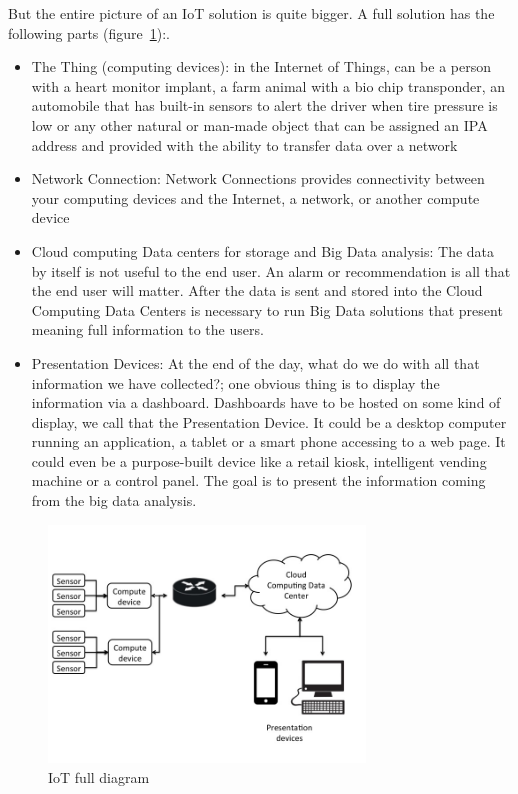 But the entire picture of an IoT solution is quite bigger. A full solution has 
the following parts (figure~\ref{fig:1.1}):.

\begin{itemize} 

\item The Thing (computing devices):  in the Internet of
Things, can be a person with a heart monitor implant, a farm animal with a bio
chip transponder, an automobile that has built-in sensors to alert the driver
when tire pressure is low or any other natural or man-made object that can be
assigned an IPA address and provided with the ability to transfer data over a
network 

\item Network Connection: Network Connections provides connectivity
between your computing devices  and the Internet, a network, or another compute
device 

\item Cloud computing Data centers for storage and Big Data analysis: The data
by itself is not useful to the end user. An alarm or recommendation is all that
the end user will matter. After the data is sent and stored into the Cloud
Computing Data Centers is necessary to run Big Data solutions that present
meaning full information to the users.  

\item Presentation Devices: At the end of the day, what do we do with all that
information we have collected?; one obvious thing is to display the information
via a dashboard. Dashboards have to be hosted on some kind of display, we call
that the Presentation Device.  It could be a desktop computer running an 
application, a tablet or a smart phone accessing to a web page. It could
even be a purpose-built device like a retail kiosk, intelligent vending machine
or a control panel. The goal is to present the information coming from the big
data analysis.

\end{itemize}

\begin{figure}[H]
\centering
\includegraphics[width=0.75\textwidth]{images/IoT_diagram.jpg}
\caption{IoT full diagram }
\label{fig:1.1}
\end{figure}

